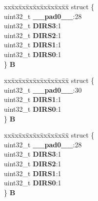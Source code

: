 \begin{DoxyCompactItemize}
\begin{tabbing}
\end{tabbing}\item 
\mbox{\label{unionSIU__tag_1_1SIU__DIRSR__tag_aa1d2f362a89fe49eb4ec6b0b6ad0eaa3}} 
\begin{tabbing}
xx\=xx\=xx\=xx\=xx\=xx\=xx\=xx\=xx\=\kill
struct \{\\
\>uint32\_t {\bfseries \_\_pad0\_\_}:28\\
\>uint32\_t {\bfseries DIRS3}:1\\
\>uint32\_t {\bfseries DIRS2}:1\\
\>uint32\_t {\bfseries DIRS1}:1\\
\>uint32\_t {\bfseries DIRS0}:1\\
\} {\bfseries B}\\

\end{tabbing}\item 
\mbox{\label{unionSIU__tag_1_1SIU__DIRSR__tag_a3dd679ac7f2f1eb282bc5985d20ec418}} 
\begin{tabbing}
xx\=xx\=xx\=xx\=xx\=xx\=xx\=xx\=xx\=\kill
struct \{\\
\>uint32\_t {\bfseries \_\_pad0\_\_}:30\\
\>uint32\_t {\bfseries DIRS1}:1\\
\>uint32\_t {\bfseries DIRS0}:1\\
\} {\bfseries B}\\

\end{tabbing}\item 
\mbox{\label{unionSIU__tag_1_1SIU__DIRSR__tag_af0cfb0e0dffbd2d50f66b0f867cb40be}} 
\begin{tabbing}
xx\=xx\=xx\=xx\=xx\=xx\=xx\=xx\=xx\=\kill
struct \{\\
\>uint32\_t {\bfseries \_\_pad0\_\_}:28\\
\>uint32\_t {\bfseries DIRS3}:1\\
\>uint32\_t {\bfseries DIRS2}:1\\
\>uint32\_t {\bfseries DIRS1}:1\\
\>uint32\_t {\bfseries DIRS0}:1\\
\} {\bfseries B}\\

\end{tabbing}\end{DoxyCompactItemize}


